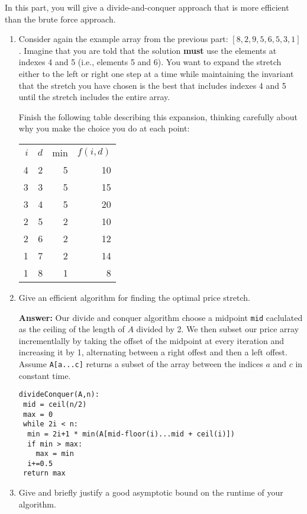 \documentclass[11pt, oneside]{article}   	%
\theoremstyle{definition}
\theoremstyle{remark}
\begin{document}
In this part, you will give a divide-and-conquer approach that is more
efficient than the brute force approach.
\begin{enumerate}
\item Consider again the example array from the previous part: $[8, 2, 9,
   5, 6, 5, 3, 1]$. Imagine that you are told that the solution \textbf{must}
   use the elements at indexes 4 and 5 (i.e., elements 5 and 6). You
   want to expand the stretch either to the left or right one step at
   a time while maintaining the invariant that the stretch you have
   chosen is the best that includes indexes 4 and 5 until the stretch
   includes the entire array.
   
   Finish the following table describing this expansion, thinking
   carefully about why you make the choice you do at each point:

\begin{center}
\begin{tabular}{rrrr}
    $i$  &     $d$  &    min &    $f(i,d)$  \\
      4  &       2  &        5  &        10  \\
      3  &       3  &        5  &        15  \\
      3  &       4  &        5  &        20  \\
 	  2  &       5  &        2  &        10  \\
 	  2  &		6  &			2 &		   12 \\
 	  1  & 		7  &			2 & 			14\\
      1  &       8  &        1  &         8  \\
\end{tabular}
\end{center}


\item Give an efficient algorithm for finding the optimal price stretch.

\textbf{Answer: } Our divide and conquer algorithm choose a midpoint \texttt{mid} caclulated as the ceiling of the length of $A$ divided by 2. We then subset our price array incrementlally by taking the offset of the midpoint at every iteration and increasing it by 1, alternating between a right offest and then a left offest. Assume \texttt{A[a...c]} returns a subset of the array between the indices $a$ and $c$ in constant time.
\begin{verbatim}
divideConquer(A,n):
 mid = ceil(n/2)
 max = 0
 while 2i < n:
  min = 2i+1 * min(A[mid-floor(i)...mid + ceil(i)])
  if min > max:
  	max = min
  i+=0.5
 return max
\end{verbatim}
\item Give and briefly justify a good asymptotic bound on the runtime of
   your algorithm.
\end{enumerate}
\end{document}
